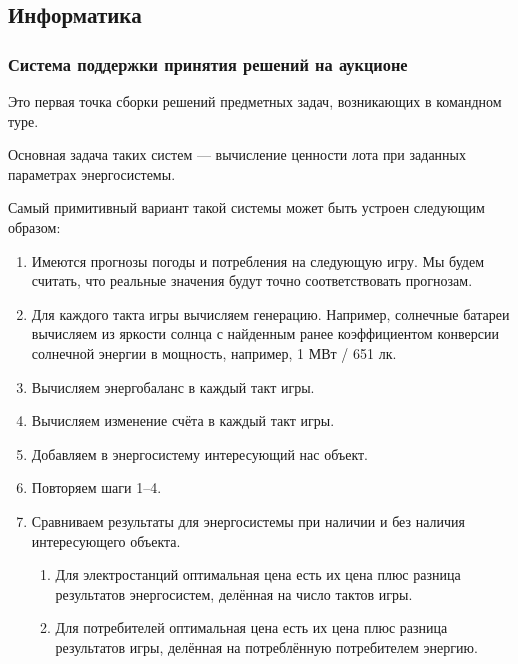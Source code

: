 \subsection*{Информатика}

\subsubsection*{Система поддержки принятия решений на аукционе}

Это первая точка сборки решений предметных задач, возникающих в командном туре.

Основная задача таких систем — вычисление ценности лота при заданных параметрах энергосистемы.

Самый примитивный вариант такой системы может быть устроен следующим образом:

\begin{enumerate}
    \item Имеются прогнозы погоды и потребления на следующую игру. Мы будем считать, что реальные значения будут точно соответствовать прогнозам.
    \item Для каждого такта игры вычисляем генерацию. Например, солнечные батареи вычисляем из яркости солнца с найденным ранее коэффициентом конверсии солнечной энергии в мощность, например, 1 МВт / 651 лк.
    \item Вычисляем энергобаланс в каждый такт игры.
    \item Вычисляем изменение счёта в каждый такт игры.
    \item Добавляем в энергосистему интересующий нас объект.
    \item Повторяем шаги 1–4.
    \item Сравниваем результаты для энергосистемы при наличии и без наличия интересующего объекта.       
    \begin{enumerate}
        \item Для электростанций оптимальная цена есть их цена плюс разница результатов энергосистем, делённая на число тактов игры.
        \item Для потребителей оптимальная цена есть их цена плюс разница результатов игры, делённая на потреблённую потребителем энергию.  
    \end{enumerate}
\end{enumerate}

